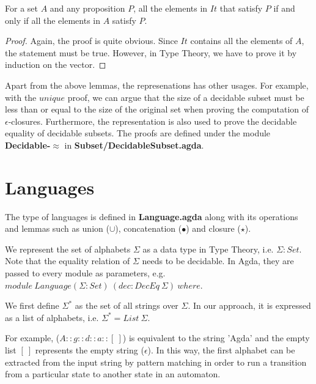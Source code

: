\begin{lem}
\noindent For a set \(A\) and any proposition \(P\), all
the elements in \(It\) that satisfy \(P\) if and only if all the 
elements in \(A\) satisfy \(P\). 
\end{lem}

\begin{proof}
\noindent Again, the proof is quite obvious. Since \(It\) contains all the
elements of \(A\), the statement must be true. However, in Type
Theory, we have to prove it by induction on the vector.
\end{proof}

\par Apart from the above lemmas, the represenations has other
usages. For example, with the \(unique\) proof, we can argue that the size
of a decidable subset must be less than or equal to the size of the
original set when proving the computation of
\(\epsilon\)-closures. Furthermore, the representation is also used to
prove the decidable equality of decidable subsets. The proofs are
defined under the module \textbf{Decidable-\(\approx\)} in
\textbf{Subset/DecidableSubset.agda}. 


\section{Languages}
\par The type of languages is defined in \textbf{Language.agda} along with its 
operations and lemmas such as union (\(\cup\)), concatenation
(\(\bullet\)) and closure (\(\star\)). 

\par We represent the set of alphabets \(\Sigma\) as a data type in
Type Theory, i.e. \(\Sigma : Set\). Note that the equality relation of \(\Sigma\) needs to be
decidable. In Agda, they are passed to every module as
parameters, e.g. \(module\ Language (\Sigma : Set)\ (dec : DecEq\
\Sigma)\ where\). 

\begin{defn}
\noindent We first define \(\Sigma^*\) as the set of all
strings over \(\Sigma\). In our approach, it is expressed as a list of
alphabets, i.e. \(\Sigma^* = List\ \Sigma\). 
\end{defn}

\par For example, (\(A :: g :: d :: a :: [\ ]\)) is equivalent to the
string 'Agda' and the empty list \([\ ]\)
represents the empty string (\(\epsilon\)). In this way, the first
alphabet can be extracted from the input string by pattern matching in order to
run a transition from a particular state to another state in an automaton. 

